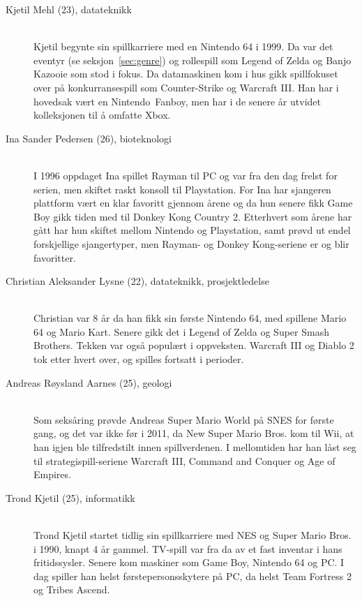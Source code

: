 \begin{description}
\item[Kjetil Mehl (23), datateknikk] \hfill \\
Kjetil begynte sin spillkarriere med en \gls{Nintendo 64} i 1999. Da
var det eventyr (se seksjon~\ref{sec:genre}) og rollespill som
\gls{Legend of Zelda} og \gls{Banjo Kazooie} som
stod i fokus. Da datamaskinen kom i hus gikk spillfokuset  over på
konkurransespill som \gls{Counter-Strike} og \gls{Warcraft III}. Han har i hovedsak vært
en Nintendo~\gls{Fanboy}, men har i de senere år utvidet
kolleksjonen til å omfatte Xbox.

\item[Ina Sander Pedersen (26), bioteknologi] \hfill \\
I 1996 oppdaget Ina spillet \gls{Rayman} til PC og var fra den dag frelst for
serien, men skiftet raskt konsoll til Playstation. For Ina har sjangeren
plattform vært en klar favoritt gjennom årene og da hun senere fikk
\gls{Game Boy} gikk tiden med til \gls{Donkey Kong Country 2}. Etterhvert som årene har gått har hun skiftet mellom
Nintendo og Playstation, samt prøvd ut endel forskjellige sjangertyper,
men Rayman- og Donkey Kong-seriene er og blir favoritter. 

\item[Christian Aleksander Lysne (22), datateknikk, prosjektledelse] \hfill \\
Christian var 8 år da han fikk sin første \gls{Nintendo 64}, med
spillene \gls{Mario 64} og \gls{Mario Kart}.
Senere gikk det i \gls{Legend of Zelda}  og \gls{Super Smash Brothers}.
\gls{Tekken} var også  populært i oppveksten. \gls{Warcraft III} og
\gls{Diablo 2} tok etter hvert over, og spilles fortsatt i perioder.

\item[Andreas Røysland Aarnes (25), geologi] \hfill \\
Som seksåring prøvde Andreas \gls{Super Mario World} på
\gls{SNES} for første gang, og det var ikke før
i 2011, da New Super Mario Bros. kom til
\gls{Wii}, at han igjen ble tilfredstilt innen
spillverdenen. I mellomtiden har han låst seg til strategispill-seriene
\gls{Warcraft III}, \gls{Command and Conquer} og Age of
Empires. 

\item[Trond Kjetil (25), informatikk] \hfill \\
Trond Kjetil startet tidlig sin spillkarriere med \gls{NES} og Super Mario Bros. i 1990, knapt 4 år gammel. TV-spill var fra da av et fast inventar i hans fritidssysler. Senere kom maskiner som \gls{Game Boy}, \gls{Nintendo 64} og PC. I dag spiller han helst førstepersonsskytere på PC, da helst \gls{Team Fortress 2} og \gls{Tribes Ascend}.
\end{description}

